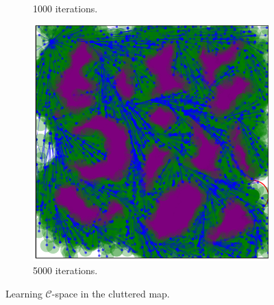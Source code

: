\documentclass{beamer}
\begin{document}
\begin{frame}
\begin{figure}
\begin{subfigure}[b]{0.32\textwidth}
		  \caption{1000 iterations.}
		\end{subfigure}  
		\begin{subfigure}[b]{0.32\textwidth}
		  \includegraphics[width=\textwidth]{figChap5/Maze_clutter_RRTstarML_learning5000.pdf}  
		  \caption{5000 iterations.}
		\end{subfigure}  
		\caption{Learning $\mathcal{C}$-space in the cluttered map.}
		\label{fig:learning_clutter}
	  \end{figure}
\end{frame}	
\end{document}
